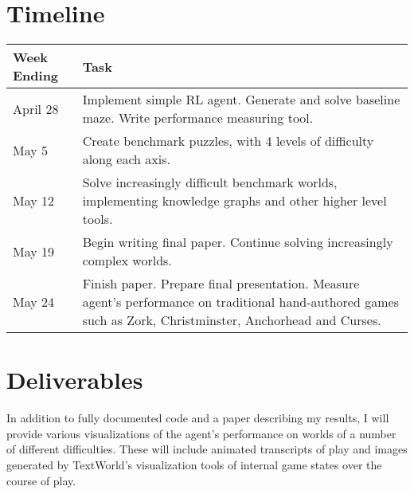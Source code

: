 \documentclass{article}
\begin{document}
\section{Timeline}

\begin{tabular}{p{1in}|p{\dimexpr\linewidth-1in-4\tabcolsep}}
    \hline
    \textbf{Week Ending} & \textbf{Task} \\
    \hline
    April 28 & Implement simple RL agent. Generate and solve baseline
    maze. Write performance measuring tool.\\
    May 5 & Create benchmark puzzles, with 4 levels of difficulty along
    each axis.\\
    May 12 & Solve increasingly difficult benchmark worlds, implementing
    knowledge graphs and other higher level tools.\\
    May 19 & Begin writing final paper. Continue solving increasingly
    complex worlds.\\
    May 24 & Finish paper. Prepare final presentation. Measure agent's
    performance on traditional hand-authored games such as Zork,
    Christminster, Anchorhead and Curses.\\
\end{tabular}

\section{Deliverables}

In addition to fully documented code and a paper describing my results,
I will provide various visualizations of the agent's performance on
worlds of a number of different difficulties. These will include
animated transcripts of play and images generated by TextWorld's
visualization tools of internal game states over the course of play.

\printbibliography
\end{document}
